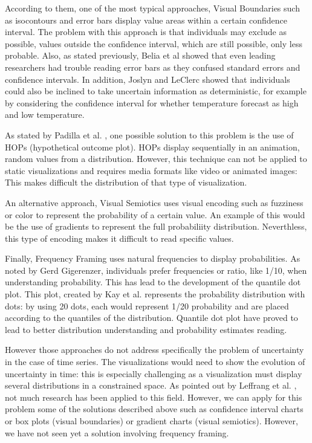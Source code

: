 \documentclass[a4paper,3p,sort&compress]{elsarticle}
\begin{document}
According to them, one of the most typical approaches, Visual Boundaries such as isocontours and error 
bars display value areas within a certain confidence interval. The problem with this approach is 
that individuals may exclude as possible, values outside the confidence interval, which are still 
possible, only less probable. Also, as stated previously, Belia et al \cite{belia_researchers_2005} showed that even leading researchers had 
trouble reading error bars as they confused 
standard errors and confidence intervals. In addition, Joslyn and LeClerc showed that individuals could also be inclined to take uncertain 
information as deterministic, for example by considering the confidence interval for whether temperature 
forecast as high and low temperature. 

As stated by Padilla et al. \cite{padilla_uncertainty_2021}, one possible solution to this problem is the use of HOPs 
(hypothetical outcome plot). HOPs display 
sequentially in an animation, random values from a distribution. However, this technique can not be 
applied to static visualizations and requires media formats like video or animated images: This makes difficult the distribution 
of that type of visualization.

An alternative approach, Visual Semiotics uses visual encoding such as fuzziness or color to represent 
the probability of a certain value. An example of this would be the use of gradients to represent the 
full probabiliity distribution. Neverthless, this type of encoding makes it difficult to read specific 
values. 

Finally, Frequency Framing uses natural frequencies to display probabilities. As noted by Gerd 
Gigerenzer, individuals prefer frequencies or ratio, like 1/10, when understanding probability. This has 
lead to the development of the quantile dot plot. This plot, created by Kay et al. \cite{2016-when-ish-is-my-bus}
\cite{2016-when-ish-is-my-bus} 
represents 
the probability distribution with dots: by using 20 dots, each would represent 1/20 probability 
and are placed according 
to the quantiles of the distribution. Quantile dot plot have proved to lead to better distribution 
understanding and probability estimates reading. 

However those approaches do not address specifically the problem of uncertainty in the case of time series.
The visualizations would need to show the evolution of uncertainty in time: this 
is especially challenging as a visualization must display several distributions in a constrained space.  
As pointed out by Leffrang et al. \cite{leffrang_should_2021}, not much research has been applied to this 
field. 
However, we can apply for this problem some of the solutions described above such as confidence interval charts or 
box plots (visual boundaries) or gradient charts (visual semiotics). However, we have not seen yet a solution involving 
frequency framing. 
\end{document}
